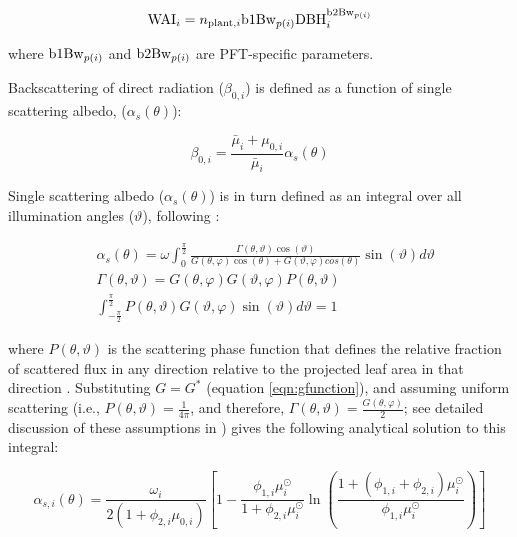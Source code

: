 \begin{equation}
  \mathrm{WAI}_{i} = n_{\mathrm{plant}, i} \mathrm{b1Bw}_{p(i)} \mathrm{DBH}_{i}^{\mathrm{b2Bw}_{p(i)}}
\end{equation}

where $\mathrm{b1Bw}_{p(i)}$ and $\mathrm{b2Bw}_{p(i)}$ are PFT-specific parameters.

Backscattering of direct radiation ($\beta_{0, i}$) is defined as a function of single scattering albedo, ($\alpha_{s}(\theta)$):

\begin{equation}
  \beta_{0, i} = \frac{\bar{\mu}_{i} + \mu_{0, i}}{\bar{\mu}_{i}} \alpha_{s}(\theta)
\end{equation}

Single scattering albedo ($\alpha_{s}(\theta)$) is in turn defined as an integral over all illumination angles ($\vartheta$), following \citet{sellers1985canopy} :

\begin{align}
  & \alpha_{s}(\theta) = \omega \int_{0}^{\frac{\pi}{2}} \frac{\Gamma(\theta, \vartheta) \cos(\vartheta)} {G(\theta, \varphi) \cos(\theta) + G(\vartheta, \varphi) cos(\theta)} \sin(\vartheta) d \vartheta \\
  & \Gamma(\theta, \vartheta) = G(\theta, \varphi) G(\vartheta, \varphi) P(\theta, \vartheta) \\
  & \int_{-\frac{\pi}{2}}^{\frac{\pi}{2}} P(\theta, \vartheta) G(\vartheta, \varphi) \sin(\vartheta) d\vartheta = 1
\end{align}

where $P(\theta, \vartheta)$ is the scattering phase function that defines the relative fraction of scattered flux in any direction relative to the projected leaf area in that direction \citep{dickinson1983land}.
Substituting $G = G^{*}$ (equation \ref{eqn:gfunction}),
and assuming uniform scattering (i.e., $P(\theta, \vartheta) = \frac{1}{4\pi}$, and therefore, $\Gamma(\theta, \vartheta) = \frac{G(\theta, \varphi)}{2}$; see detailed discussion of these assumptions in \citealt{yuan2017reexamination})
gives the following analytical solution to this integral:

\begin{equation}
  \alpha_{s,i}(\theta) = \frac{\omega_{i}}{2\left( 1 + \phi_{2,i} \mu_{0,i} \right)}
  \left[ 1 - \frac{\phi_{1,i}\mu^{\odot}_{i}}{1 + \phi_{2,i}\mu^{\odot}_{i}} \ln\left( \frac{1 + (\phi_{1,i} + \phi_{2,i})\mu^{\odot}_{i}} {\phi_{1,i}\mu^{\odot}_{i}} \right)  \right]
\end{equation}

